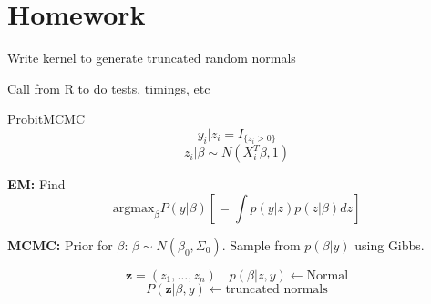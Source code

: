 \documentclass[]{article}
\begin{document}
\section*{Homework}
Write kernel to generate truncated random normals

Call from R to do tests, timings, etc

ProbitMCMC
\[y_{i}|z_{i} = I_{\{z_{i}>0\}}\]
\[z_{i}|\beta \sim N(X_{i}^{T}\beta, 1)\]

\textbf{EM:} Find 
\[\mbox{argmax}_{\beta} P(y|\beta)[=\int p(y|z)p(z|\beta)dz]\]

\textbf{MCMC:} Prior for $\beta$: $\beta\sim N(\beta_{0},\Sigma_{0})$.  Sample from $p(\beta|y)$ using Gibbs. 

\[\mathbf{z} = (z_{1},\ldots,z_{n}) \quad  p(\beta|z,y) \leftarrow \mbox{Normal} \]
\[P(\mathbf{z}|\beta, y) \leftarrow \mbox{truncated normals}\]
\end{document}
